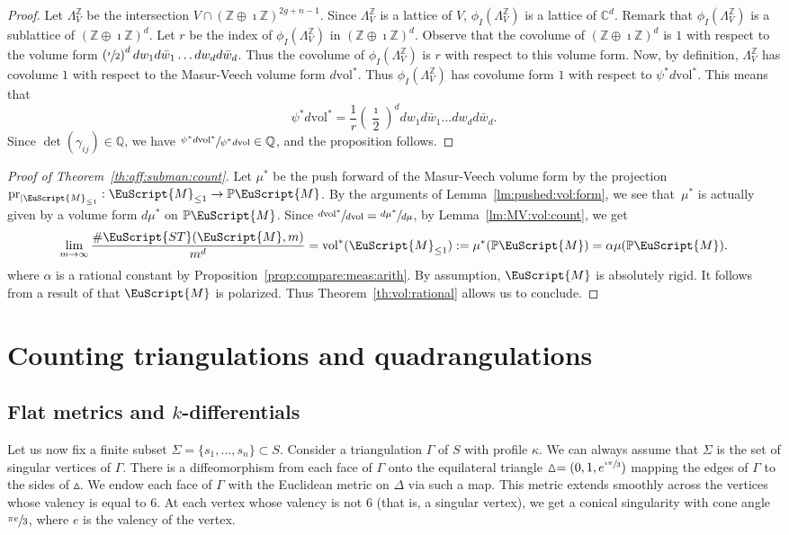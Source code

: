 \documentclass[10pt]{amsart}
\let\mathcal\EuScript
\theoremstyle{plain}
\theoremstyle{definition}
\def\C{\mathbb{C}}
\newcommand\Z{\mathbb{Z}}
\newcommand{\Q}{\mathbb{Q}}
\newcommand{\Pb}{\mathbb{P}}
\newcommand{\cM}{\mathcal{M}}
\newcommand{\ST}{\mathcal{ST}}
\newcommand{\vol}{\mathrm{vol}}
\newcommand{\pr}{\mathrm{pr}}
\let\G\Gamma
\begin{document}
\begin{proof}
Let $\Lambda^\Z_V$ be the intersection $V\cap(\Z\oplus\imath\Z)^{2g+n-1}$. Since $\Lambda^\Z_V$ is a lattice of $V$, $\phi_I(\Lambda^\Z_V)$ is a lattice of $\C^d$. Remark that $\phi_I(\Lambda^\Z_V)$ is a sublattice of $(\Z\oplus\imath\Z)^d$. Let $r$ be the index of $\phi_I(\Lambda^\Z_V)$ in $(\Z\oplus\imath\Z)^d$. Observe that the covolume of $(\Z\oplus\imath\Z)^d$ is $1$ with respect to the volume form $\left(\sfrac{\imath}{2}\right)^ddw_1d\bar{w}_1\dots dw_d d\bar{w}_d$. Thus the covolume of $\phi_I(\Lambda^\Z_V)$ is $r$ with respect to this volume form.
Now, by definition, $\Lambda^\Z_V$ has covolume $1$ with respect to the Masur-Veech volume form $d\vol^*$. Thus $\phi_I(\Lambda^\Z_V)$ has covolume form $1$ with respect to $\psi^*d\vol^*$. This means that
\[
\psi^*d\vol^*=\frac{1}{r}\left(\frac{\imath}{2}\right)^ddw_1d\bar{w}_1\dots dw_d d\bar{w}_d.
\]
Since $\det(\gamma_{ij}) \in \Q$, we have $\sfrac{\psi^*d\vol^*}{\psi^*d\vol} \in \Q$, and the proposition follows.
\end{proof}

\begin{proof}[Proof of Theorem~\ref{th:aff:subman:count}]
Let $\mu^*$ be the push forward of the Masur-Veech volume form by the projection $\pr_{|\cM_{\leq 1}}: \cM_{\leq 1} \to \Pb\cM$.
By the arguments of Lemma~\ref{lm:pushed:vol:form}, we see that~$\mu^*$ is actually given by a volume form $d\mu^*$ on $\Pb\cM$.
Since $\sfrac{d\vol^*}{d\vol}=\sfrac{d\mu^*}{d\mu}$, by Lemma~\ref{lm:MV:vol:count}, we get
\[
\lim_{m\to \infty}\frac{\#\ST(\cM,m)}{m^d}=\vol^*(\cM_{\leq1}):=\mu^*(\Pb\cM)=\alpha\mu(\Pb\cM).
\]
where $\alpha$ is a rational constant by Proposition~\ref{prop:compare:meas:arith}. By assumption, $\cM$ is absolutely rigid. It follows from a result of \cite{AEM17} that $\cM$ is polarized. Thus Theorem~\ref{th:vol:rational} allows us to conclude.
\end{proof}

\section{Counting triangulations and quadrangulations}\label{sec:count:tiling}
\subsection{Flat metrics and $k$-differentials}\label{sec:flat:kdiff}
Let us now fix a finite subset $\Sigma=\{s_1,\dots,s_n\} \subset S$. Consider a triangulation $\G$ of $S$ with profile $\kappa$. We can always assume that $\Sigma$ is the set of singular vertices of $\G$.
There is a diffeomorphism from each face of $\G$ onto the equilateral triangle $\vartriangle=(0,1,e^{\sfrac{\imath\pi}{3}})$ mapping the edges of $\G$ to the sides of $\vartriangle$.
We endow each face of $\G$ with the Euclidean metric on $\Delta$ via such a map.
This metric extends smoothly across the vertices whose valency is equal to $6$.
At each vertex whose valency is not $6$ (that is, a singular vertex), we get a conical singularity with cone angle $\sfrac{\pi e}{3}$, where $e$ is the valency of the vertex.
\end{document}
